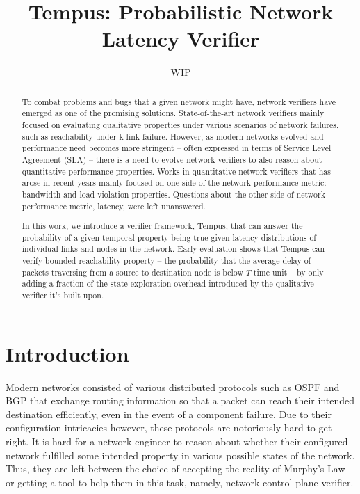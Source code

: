 \documentclass[10pt,sigconf,letterpaper,anonymous,nonacm]{acmart}
\title{Tempus: Probabilistic Network Latency Verifier}
\author{WIP}
\begin{document}
\begin{abstract}
    To combat problems and bugs that a given network might have, network verifiers have emerged as 
    one of the promising solutions. 
    State-of-the-art network verifiers mainly focused on evaluating qualitative properties under 
    various scenarios of network failures, such as reachability under k-link failure. 
    However, as modern networks evolved and performance need becomes more stringent -- often 
    expressed in terms of Service Level Agreement (SLA) -- there is a need to evolve network 
    verifiers to also reason about quantitative performance properties. 
    Works in quantitative network verifiers that has arose in recent years mainly focused on one 
    side of the network performance metric: bandwidth and load violation properties. 
    Questions about the other side of network performance metric, latency, were left unanswered. 

    In this work, we introduce a verifier framework, Tempus, that can answer the probability of 
    a given temporal property being true given latency distributions of individual links and 
    nodes in the network. 
    Early evaluation shows that Tempus can verify bounded reachability property -- the probability
    that the average delay of packets traversing from a source to destination node is below $T$
    time unit -- by only adding a fraction of the state exploration overhead introduced by the 
    qualitative verifier it's built upon.
\end{abstract}

\maketitle

\section{Introduction}
Modern networks consisted of various distributed protocols such as OSPF and BGP that exchange 
routing information so that a packet can reach their intended destination efficiently, even in the 
event of a component failure.
Due to their configuration intricacies however, these protocols are notoriously hard to get right. 
It is hard for a network engineer to reason about whether their configured network fulfilled some 
intended property in various possible states of the network. 
Thus, they are left between the choice of accepting the reality of Murphy's Law or getting a tool 
to help them in this task, namely, network control plane verifier.
\end{document}
